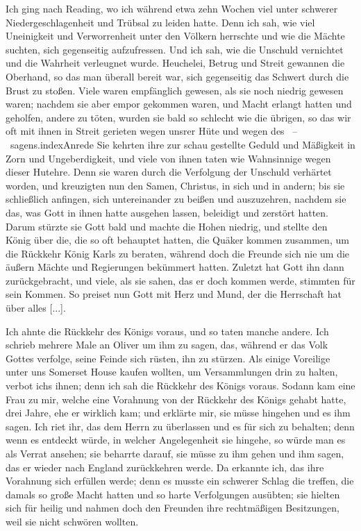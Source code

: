 Ich ging nach Reading, wo ich während etwa zehn Wochen
viel unter schwerer Niedergeschlagenheit und Trübsal zu leiden
hatte. Denn ich sah, wie viel Uneinigkeit und Verworrenheit 
unter den Völkern herrschte und wie die Mächte suchten, sich
gegenseitig aufzufressen. Und ich sah, wie die Unschuld vernichtet
und die Wahrheit verleugnet wurde. Heuchelei, Betrug und
Streit gewannen die Oberhand, so das man überall bereit war,
sich gegenseitig das Schwert durch die Brust zu stoßen. Viele
waren empfänglich gewesen, als sie noch niedrig gewesen waren;
nachdem sie aber empor gekommen waren, und Macht erlangt
hatten und geholfen, andere zu töten, wurden sie bald so
schlecht wie die übrigen, so das wir oft mit ihnen in Streit 
gerieten wegen unsrer Hüte und wegen des 
~--~sagens.index{Anrede} Sie
kehrten ihre zur schau gestellte Geduld und Mäßigkeit in Zorn und
Ungeberdigkeit, und viele von ihnen taten wie Wahnsinnige wegen
dieser Hutehre. Denn sie waren durch die Verfolgung der 
Unschuld verhärtet worden, und kreuzigten nun den Samen,
Christus, in sich und 
in andern; bis sie schließlich anfingen, sich
untereinander zu beißen und auszuzehren, nachdem sie das, was
Gott in ihnen hatte ausgehen lassen, beleidigt und zerstört hatten.
Darum stürzte sie Gott bald und machte die Hohen niedrig, und
stellte den König über die, die so oft behauptet hatten, die Quäker
kommen zusammen, um die Rückkehr König Karls 
zu beraten,
während doch die Freunde sich nie um die äußern Mächte und
Regierungen bekümmert hatten. Zuletzt hat 
Gott ihn dann zurückgebracht, und viele, als sie sahen, 
das er doch kommen werde,
stimmten für sein Kommen. So preiset nun Gott mit Herz und
Mund, der die Herrschaft hat über alles [...]. 

Ich ahnte die
Rückkehr des Königs voraus, und so taten manche andere. Ich
schrieb mehrere Male an Oliver 
um ihm zu sagen, das, während
er das Volk Gottes verfolge, seine Feinde sich rüsten, ihn zu
stürzen. Als einige Voreilige unter uns 
Somerset House kaufen
wollten, um Versammlungen drin zu halten, verbot ichs ihnen;
denn ich sah die Rückkehr des Königs voraus. Sodann kam eine
Frau zu mir, welche eine Vorahnung von der Rückkehr des
Königs gehabt hatte, drei Jahre, ehe er wirklich kam; und 
erklärte mir, sie müsse hingehen und es ihm sagen. Ich riet ihr,
das dem Herrn zu überlassen und es für sich zu behalten; denn
wenn es entdeckt würde, in welcher Angelegenheit sie hingehe, so
würde man es als Verrat ansehen; sie beharrte darauf, sie müsse
zu ihm gehen und ihm sagen, das er wieder nach England 
zurückkehren werde. Da erkannte ich, das ihre Vorahnung sich
erfüllen werde; denn es musste ein schwerer Schlag die treffen,
die damals so große Macht hatten und so harte Verfolgungen
ausübten; sie hielten sich für heilig und nahmen doch den Freunden
ihre rechtmäßigen Besitzungen, weil sie nicht schwören wollten.


